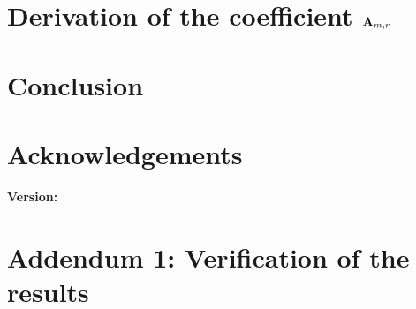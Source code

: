 \documentclass[12pt,letterpaper,oneside,reqno]{amsart}
\newcommand \coeffA [3][A] {{\mathbf{#1}} \sb{#2,#3}}
\numberwithin{equation}{section}
\begin{document}
    \section{Derivation of the coefficient \texorpdfstring{$\coeffA{m}{r}$}{A[m,r]}}
    \label{sec:derivation-of-coefficients-a}
    


    \section{Conclusion}
    \label{sec:conclusion}
    


    \section{Acknowledgements}
    \label{sec:acknowledgements}
    


    
    
    \noindent \textbf{Version:} 

    \clearpage


    \section{Addendum 1: Verification of the results}
    \label{sec:verification-of-the-results-and-examples}
    
\end{document}
